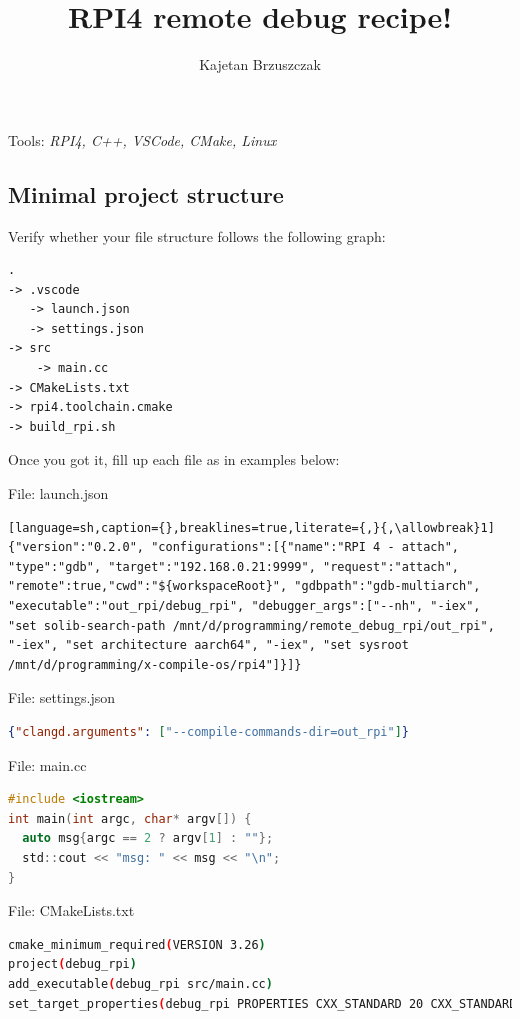 \documentclass[twocolumn, 10pt]{article}
\title{RPI4 remote debug recipe!}
\author{Kajetan Brzuszczak}
\makeatletter
\renewcommand{\maketitle}{
\begin{flushleft}
{\noindent\Huge\bf\@title}\break
\end{flushleft}
}
\makeatother
\begin{document}
\maketitle

Tools: \textit{RPI4, C++, VSCode, CMake, Linux}

\subsection*{Minimal project structure}
\small

Verify whether your file structure follows the following graph:
\begin{lstlisting}[language=txt,backgroundcolor=\color{gray!10},caption={}]
.
-> .vscode
   -> launch.json
   -> settings.json
-> src
    -> main.cc
-> CMakeLists.txt
-> rpi4.toolchain.cmake
-> build_rpi.sh
\end{lstlisting}

Once you got it, fill up each file as in examples below:

\tiny{}File: launch.json\small{}
\begin{lstlisting}[language=sh,caption={},breaklines=true,literate={,}{,\allowbreak}1]
{"version":"0.2.0", "configurations":[{"name":"RPI 4 - attach", "type":"gdb", "target":"192.168.0.21:9999", "request":"attach", "remote":true,"cwd":"${workspaceRoot}", "gdbpath":"gdb-multiarch", "executable":"out_rpi/debug_rpi", "debugger_args":["--nh", "-iex", "set solib-search-path /mnt/d/programming/remote_debug_rpi/out_rpi", "-iex", "set architecture aarch64", "-iex", "set sysroot /mnt/d/programming/x-compile-os/rpi4"]}]}
\end{lstlisting}

\tiny{}File: settings.json\small{}
\begin{lstlisting}[language=json,breaklines=true,caption={}]
{"clangd.arguments": ["--compile-commands-dir=out_rpi"]}
\end{lstlisting}

\tiny{}File: main.cc\small{}
\begin{lstlisting}[language=c,caption={}]
#include <iostream>
int main(int argc, char* argv[]) {
  auto msg{argc == 2 ? argv[1] : ""};
  std::cout << "msg: " << msg << "\n";
}
\end{lstlisting}

\tiny{}File: CMakeLists.txt\small{}
\begin{lstlisting}[language=sh,breaklines=true,caption={}]
cmake_minimum_required(VERSION 3.26)
project(debug_rpi)
add_executable(debug_rpi src/main.cc)
set_target_properties(debug_rpi PROPERTIES CXX_STANDARD 20 CXX_STANDARD_REQUIRED True)
\end{lstlisting}
\end{document}
